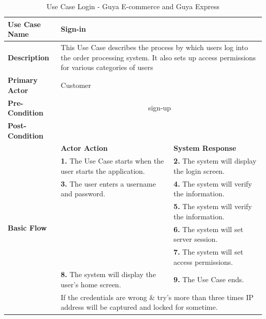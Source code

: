 \begin{table}[!ht]
\begin{tabular}{|l|p{6cm}|p{6cm}|}
\hline 
\rule[-1ex]{0pt}{2.5ex} \textbf{Use Case Name} & \multicolumn{2}{p{10cm}|}{Sign-in} \\ 
\hline 
\rule[-1ex]{0pt}{2.5ex} \textbf{Description} &\multicolumn{2}{p{10cm}|}{This Use Case describes the process by which users log into the order processing system. It also sets up access permissions for various categories of users} \\ 
\hline 
\rule[-1ex]{0pt}{2.5ex} \textbf{Primary Actor}& \multicolumn{2}{p{10cm}|}{Customer} \\ 
\hline 
\rule[-1ex]{0pt}{2.5ex} \textbf{Pre-Condition} & \multicolumn{2}{c|}{sign-up} \\ 
\hline 
\rule[-1ex]{0pt}{2.5ex} \textbf{Post-Condition} & \multicolumn{2}{p{10cm}|}{}  \\ 
\hline 
\multirow{8}{*}{\textbf{Basic Flow}} & \textbf{Actor Action} & \textbf{System Response}\\
%
&
\textbf{1.}  The Use Case starts when the user starts the application.
& 
\textbf{2.}  The system will display the login screen.
\\
%
&
\textbf{3.}  The user enters a username and password.
& 
\textbf{4.}  The system will verify the information. 
\\
%
&

& 
\textbf{5.}  The system will verify the information. 
\\
%
&

& 
\textbf{6.}  The system will set server session. 
\\
%
&

& 
\textbf{7.}  The system will set access permissions. 
\\
%
&
\textbf{8.}  The system will display the user's home screen.
& 
\textbf{9.}  The Use Case ends. 
\\
\hline 
\rule[-1ex]{0pt}{2.5ex} \textbf{Alternate Flow} & \multicolumn{2}{p{10cm}|}{If the credentials are wrong \& try's more than three times IP address will be captured and locked for sometime.}  \\ 
\hline 
\end{tabular}
\caption{Use Case Login - Guya E-commerce and Guya Express} 
\end{table}


